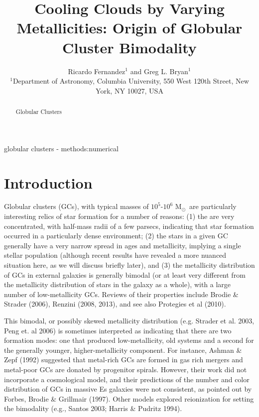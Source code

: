 \documentclass[useAMS,usenatbib]{mn2e}
\title{Cooling Clouds by Varying Metallicities: Origin of Globular Cluster Bimodality}
\author[R. Fernandez et al.]{Ricardo Fernandez$^{1}$ and Greg L. Bryan$^{1}$\\
$^{1}$Department of Astronomy, Columbia University, 550 West 120th Street, New York, NY 10027, USA}
\newcommand{\msun}{{M$_\odot$}}
\begin{document}
\date{}


\maketitle


\begin{abstract}
Globular Clusters
\end{abstract}

\begin{keywords}
globular clusters - methods:numerical
\end{keywords}

%
\section{Introduction}

Globular clusters (GCs), with typical masses of $10^5$-$10^6$ \msun\ are particularly interesting relics of star formation for a number of reasons: (1) the are very concentrated, with half-mass radii of a few parsecs, indicating that star formation occurred in a particularly dense environment; (2) the stars in a given GC generally have a very narrow spread in ages and metallicity, implying a single stellar population (although recent results have revealed a more nuanced situation here, as we will discuss briefly later), and (3) the metallicity distribution of GCs in external galaxies is generally bimodal (or at least very different from the metallicity distribution of stars in the galaxy as a whole), with a large number of low-metallicity GCs.  Reviews of their properties include Brodie \& Strader (2006), Renzini (2008, 2013), and see also Protegies et al (2010).

This bimodal, or possibly skewed metallicity distribution (e.g. Strader et al. 2003, Peng et. al 2006) is sometimes interpreted as indicating that there are two formation modes: one that produced low-metallicity, old systems and a second for the generally younger, higher-metallicity component.  For instance, Ashman \& Zepf (1992) suggested that metal-rich GCs are formed in gas rich mergers and metal-poor GCs are donated by progenitor spirals.  However, their work did not incorporate a cosmological model, and their predictions of the number and color distribution of GCs in massive Es galaxies were not consistent, as pointed out by Forbes, Brodie \& Grillmair (1997).  Other models explored reionization for setting the bimodality (e.g., Santos 2003; Harris \& Pudritz 1994).
\end{document}
